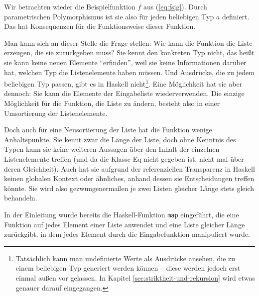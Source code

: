 
Wir betrachten wieder die Beispielfunktion $f$ aus (\ref{eq:fsig}). Durch parametrischen Polymorphismus ist sie also für jeden beliebigen
Typ $a$ definiert. Das hat Konsequenzen für die Funktionsweise dieser Funktion.

Man kann sich an dieser Stelle die Frage stellen: Wie kann die Funktion die Liste erzeugen, die sie zurückgeben muss? Sie kennt den konkreten Typ nicht,
das heißt sie kann keine neuen Elemente ``erfinden'', weil sie keine Informationen darüber hat, welchen Typ die Listenelemente haben müssen.
Und Ausdrücke, die zu jedem beliebigen Typ passen, gibt es in Haskell
nicht\footnote{Tatsächlich kann man undefinierte Werte als Ausdrücke ansehen, die zu einem beliebigen Typ generiert werden können --
diese werden jedoch erst einmal außen vor gelassen. In Kapitel \ref{sec:striktheit-und-rekursion} wird etwas genauer darauf eingegangen.}.
Eine Möglichkeit hat sie aber dennoch: Sie kann die Elemente der Eingabeliste wiederverwenden.
Die einzige Möglichkeit für die Funktion, die Liste zu ändern, besteht also in einer Umsortierung der Listenelemente.

Doch auch für eine Neusortierung der Liste hat die Funktion wenige Anhaltspunkte. Sie kennt zwar die Länge der Liste, doch ohne Kenntnis des Typen kann sie keine weiteren Aussagen über den Inhalt der einzelnen Listenelemente treffen (und da die Klasse Eq
nicht gegeben ist, nicht mal über deren Gleichheit). Auch hat sie aufgrund der referenziellen Transparenz %
in Haskell keinen globalen Kontext oder ähnliches, anhand dessen sie Entscheidungen treffen könnte.
Sie wird also gezwungenermaßen je zwei Listen gleicher Länge stets gleich behandeln.

In der Einleitung wurde bereits die Haskell-Funktion \texttt{map} eingeführt, die eine Funktion auf jedes Element einer Liste
anwendet und eine Liste gleicher Länge zurückgibt, in dem jedes Element durch die Eingabefunktion manipuliert wurde.


